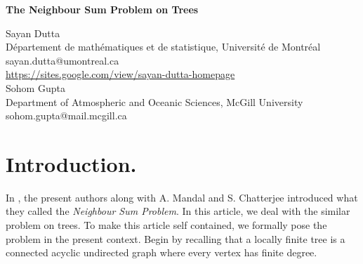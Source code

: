 \documentclass[11pt]{article}
\date{}
\begin{document}
\medskip\medskip
\begin{center}
\vspace*{50pt}
{\LARGE\bf The Neighbour Sum Problem on Trees}

\bigskip
{\small Sayan Dutta}\\[1.2ex] 
{\scriptsize Département de mathématiques et de statistique, Université de Montréal\\
sayan.dutta@umontreal.ca\\
\href{https://sites.google.com/view/sayan-dutta-homepage}{https://sites.google.com/view/sayan-dutta-homepage}}
\\[1.8ex]

{\small Sohom Gupta}\\[1.2ex] 
{\scriptsize Department of Atmospheric and Oceanic Sciences, McGill University\\
sohom.gupta@mail.mcgill.ca}\\[1.8ex]

\end{center}


\begin{abstract}
  A graph $\mathcal G = (\mathcal V, \mathcal E)$ is said to satisfy the Neighbour Sum Property if there exists some $f:\mathcal V\to\mathbb R$ such that $f\not\equiv 0$ and it maps every vertex to the sum of the values taken by its neighbours. In this article, we provide an algorithm to check whether a given finite tree satisfies the neighbour sum property. We also find a \textit{large} class of trees on $n$ vertices that satisfy the property.
\end{abstract}

\section{Introduction.}
In \cite{sayan}, the present authors along with A. Mandal and S. Chatterjee introduced what they called the \textit{Neighbour Sum Problem}. In this article, we deal with the similar problem on trees. To make this article self contained, we formally pose the problem in the present context. Begin by recalling that a locally finite tree is a connected acyclic undirected graph where every vertex has finite degree.
\end{document}
